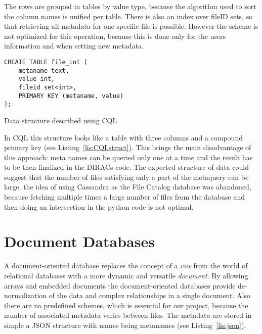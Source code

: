 The rows are grouped in tables by value type, because the algorithm used to sort the
column names is unified per table. There is also an index over fileID sets, 
so that retrieving all metadata for one specific file is possible. However the scheme is 
not optimized for this operation, because this is done only for the users information and
when setting new metadata.

\begin{listing}
\begin{verbatim}
CREATE TABLE file_int (
    metaname text,
    value int,
    fileid set<int>,
    PRIMARY KEY (metaname, value)
);
\end{verbatim}
\caption{Data structure described using CQL}
\label{lis:CQLstruct}
\end{listing}

In CQL this structure looks like a table with three columns and a compound primary key (see 
Listing~\ref{lis:CQLstruct}). 
This brings the main disadvantage of this approach: meta names can be queried only one at a time and
the result has to be then finalized in the DIRACs code. The expected structure of data could
suggest that the number of files satisfying only a part of the metaquery can be large, the idea of using 
Cassandra as the File Catalog database was abandoned, because fetching multiple times a large number of 
files from the database and then doing an intersection in the python code is not optimal. 



\section{Document Databases}

A document-oriented database replaces the concept of a \textit{row} from the world of relational 
databases with a more dynamic and versatile \textit{document}. By allowing arrays and embedded documents the 
document-oriented databases provide de-normalization of the data and complex 
relationships in a single document. Also there are no predefined schemes, which is essential for our project, because 
the number of associated metadata varies between 
files. The metadata are stored in simple a JSON structure with names being metanames (see Listing~\ref{lis:json}).

